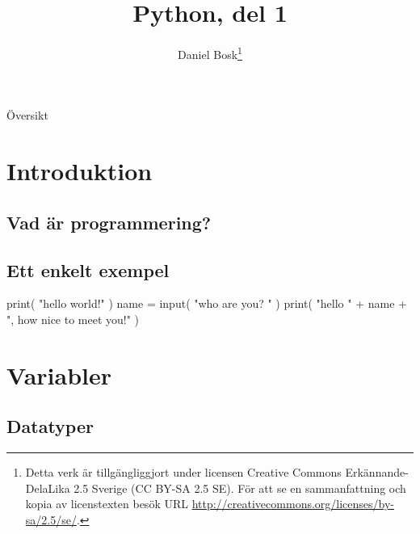 \documentclass{beamer}
\title{%
  Python, del 1
}
\author{Daniel Bosk\footnote{%
  \tiny
  Detta verk är tillgängliggjort under licensen Creative Commons 
  Erkännande-DelaLika 2.5 Sverige (CC BY-SA 2.5 SE).
  För att se en sammanfattning och kopia av licenstexten besök URL 
  \url{http://creativecommons.org/licenses/by-sa/2.5/se/}.
}}
\institute[MIUN IKS]{%
  Avdelningen för informations- och kommunikationssytem (IKS),\\
  Mittuniversitetet, Sundsvall.
}
\date{\svnId}
\begin{document}
\begin{frame}
  \titlepage
\end{frame}

\begin{frame}{Översikt}
  \tableofcontents
\end{frame}

%  





\section{Introduktion}

\subsection{Vad är programmering?}

\begin{frame}{\insertsubsectionhead}
\end{frame}

\subsection{Ett enkelt exempel}

\begin{frame}[fragile]{\insertsubsectionhead}
  \begin{src}[language=python]
print( "hello world!" )
name = input( "who are you? " )
print( "hello " + name + ", how nice to meet you!" )
  \end{src}
\end{frame}


\section{Variabler}

\subsection{Datatyper}
\end{document}
